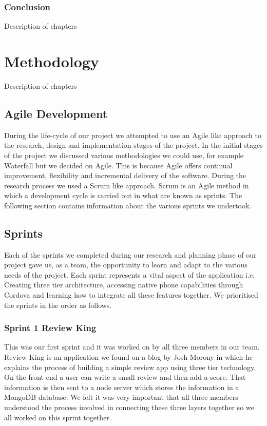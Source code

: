 \subsection{Conclusion}
Description of chapters


\chapter{Methodology}
Description of chapters

\section{Agile Development}
During the life-cycle of our project we attempted to use an Agile like approach to the research, design and implementation stages of the project. In the initial stages of the project we discussed various methodologies we could use, for example Waterfall but we decided on Agile. This is because Agile offers continual improvement, flexibility and incremental delivery of the software. During the research process we used a Scrum like approach. Scrum is an Agile method in which a development cycle is carried out in what are known as sprints. The following section contains information about the various sprints we undertook.

\section{Sprints}
Each of the sprints we completed during our research and planning phase of our project gave us, as a team, the opportunity to learn and adapt to the various needs of the project. Each sprint represents a vital aspect of the application i.e. Creating three tier architecture, accessing native phone capabilities through Cordova and learning how to integrate all these features together. We prioritised the sprints in the order as follows.

\subsection{Sprint 1 Review King}
This was our first sprint and it was worked on by all three members in our team. Review King is an application we found on a blog by Josh Morony \cite{ReviewKing} in which he explains the process of building a simple review app using three tier technology. On the front end a user can write a small review and then add a score. That information is then sent to a node server which stores the information in a MongoDB database.  We felt it was very important that all three members understood the process involved in connecting these three layers together so we all worked on this sprint together.  


